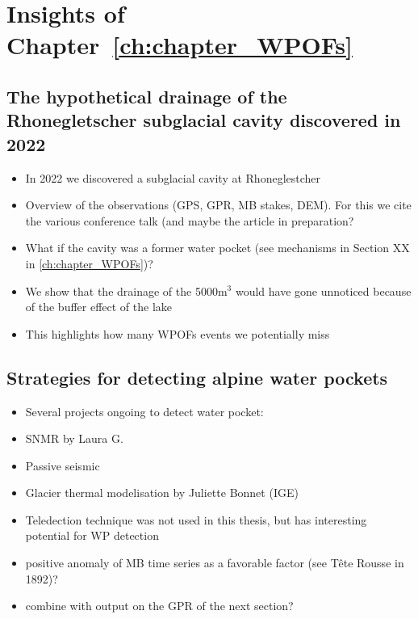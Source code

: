 \section{Insights of Chapter~\ref{ch:chapter_WPOFs}}

\subsection{ The hypothetical drainage of the Rhonegletscher subglacial cavity discovered in 2022}

\begin{itemize}
    \item In 2022 we discovered a subglacial cavity at Rhoneglestcher
    \item Overview of the observations (GPS, GPR, MB stakes, DEM). For this we cite the various conference talk (and maybe the article in preparation?
    \item What if the cavity was a former water pocket (see mechanisms in Section XX in \ref{ch:chapter_WPOFs})? 
    \item We show that the drainage of the 5000m$^3$ would have gone unnoticed because of the buffer effect of the lake
    \item This highlights how many WPOFs events we potentially miss
\end{itemize}



\subsection{ Strategies for detecting alpine water pockets}

\begin{itemize}
    \item Several projects ongoing to detect water pocket:
    \item SNMR by Laura G.
    \item Passive seismic
    \item Glacier thermal modelisation by Juliette Bonnet (IGE)
    \item Teledection technique was not used in this thesis, but has interesting potential for WP detection
    \item positive anomaly of MB time series as a favorable factor (see Tête Rousse in 1892)?
    \item combine with output on the GPR of the next section?
\end{itemize}

